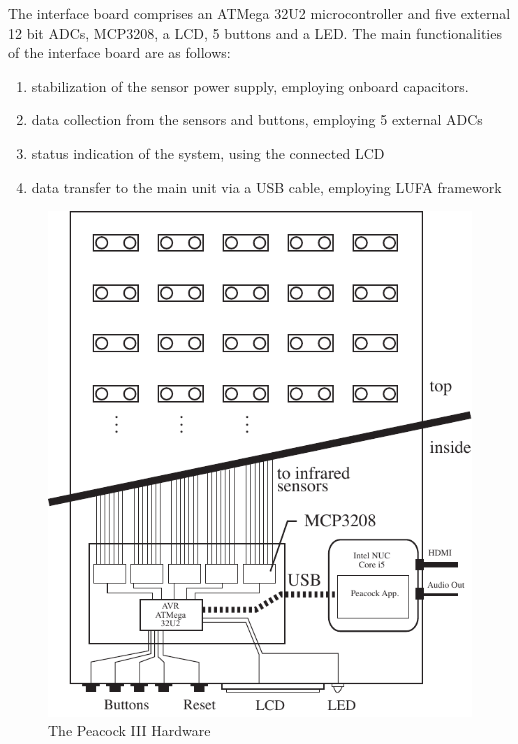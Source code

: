 \documentclass{nime-alternate}
\begin{document}
The interface board comprises an ATMega 32U2 microcontroller\cite{atmel:avr} and five external 12 bit ADCs, MCP3208, a LCD, 5 buttons and a LED. The main functionalities of the interface board are as follows:

\begin{enumerate}
       \item stabilization of the sensor power supply, employing onboard capacitors.
       \item data collection from the sensors and buttons, employing 5 external ADCs
       \item status indication of the system, using the connected LCD
       \item data transfer to the main unit via a USB cable, employing LUFA framework
\end{enumerate}

\begin{figure}[htbp]
       \begin{center}
              \includegraphics[width=1\columnwidth]{Peacock_hardware.pdf}
       \end{center}
       \caption{The Peacock III Hardware}
       \label{fig:peacock}
\end{figure}
\end{document}
